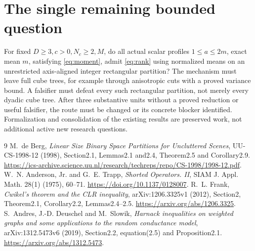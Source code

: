 \documentclass[11pt]{article}
\begin{document}
\section{The single remaining bounded question}
For fixed $D\geq3,c>0,N_c\geq2,M$, do all actual scalar profiles
$1\leq a\leq2m$, exact mean $m$, satisfying \eqref{eq:moment}, admit
\eqref{eq:rank} using normalized means on an unrestricted axis-aligned integer
rectangular partition? The mechanism must leave full cube trees, for example through
anisotropic cuts with a proved variance bound. A falsifier must defeat every such
rectangular partition, not merely every dyadic cube tree. After three substantive units
without a proved reduction or useful falsifier, the route must be changed or its concrete
blocker identified. Formalization and consolidation of the existing results are preserved
work, not additional active new research questions.

\begin{thebibliography}{9}
 M.~de Berg, \emph{Linear Size Binary Space Partitions for
Uncluttered Scenes}, UU-CS-1998-12 (1998), Section2.1, Lemmas2.1 and2.4,
Theorem2.5 and Corollary2.9.
\url{https://ics-archive.science.uu.nl/research/techreps/repo/CS-1998/1998-12.pdf}.
 W.~N. Anderson, Jr. and G.~E. Trapp,
\emph{Shorted Operators. II}, SIAM J. Appl. Math. 28(1) (1975), 60--71.
\url{https://doi.org/10.1137/0128007}.
 R.~L. Frank, \emph{Cwikel's theorem and the CLR inequality},
arXiv:1206.3325v1 (2012), Section2, Theorem2.1, Corollary2.2, Lemmas2.4--2.5.
\url{https://arxiv.org/abs/1206.3325}.
 S.~Andres, J.-D. Deuschel and M.~Slowik,
\emph{Harnack inequalities on weighted graphs and some applications to the random
conductance model}, arXiv:1312.5473v6 (2019), Section2.2, equation(2.5) and Proposition2.1.
\url{https://arxiv.org/abs/1312.5473}.
\end{thebibliography}
\end{document}
